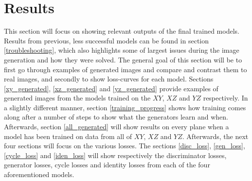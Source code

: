 \documentclass[11pt, fleqn, titlepage]{article}
\newcommand{\1}[1]{\mathds{1}\left[#1\right]}
\begin{document}
\section{Results}\label{results}
This section will focus on showing relevant outputs of the final trained models. Results from previous, less successful models can be found in section \ref{troubleshooting}, which also highlights some of largest issues during the image generation and how they were solved. The general goal of this section will be to first go through examples of generated images and compare and contrast them to real images, and secondly to show loss-curves for each model. Sections \ref{xy_generated}, \ref{xz_generated} and \ref{yz_generated} provide examples of generated images from the models trained on the $XY$, $XZ$ and $YZ$ respectively. In a slightly different manner, section \ref{training_progress} shows how training comes along after a number of steps to show what the generators learn and when. Afterwards, section \ref{all_generated} will show results on every plane when a model has been trained on data from all of $XY$, $XZ$ and $YZ$. Afterwards, the next four sections will focus on the various losses. The sections \ref{disc_loss}, \ref{gen_loss}, \ref{cycle_loss} and \ref{iden_loss} will show respectively the discriminator losses, generator losses, cycle losses and identity losses from each of the four aforementioned models.
\end{document}
